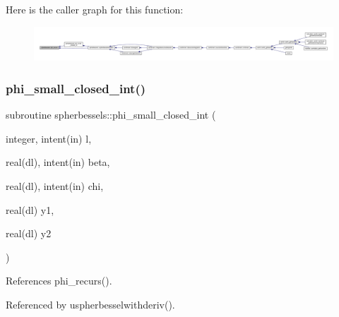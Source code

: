 Here is the caller graph for this function\+:
\nopagebreak
\begin{figure}[H]
\begin{center}
\leavevmode
\includegraphics[width=350pt]{namespacespherbessels_ac2bed68bb6862f56c27d5a5cfc5fd94d_icgraph}
\end{center}
\end{figure}
\mbox{\label{namespacespherbessels_a0d5dede9bff52decb1e7fb2d2df35d3a}} 
\subsubsection{\texorpdfstring{phi\+\_\+small\+\_\+closed\+\_\+int()}{phi\_small\_closed\_int()}}
{\footnotesize\ttfamily subroutine spherbessels\+::phi\+\_\+small\+\_\+closed\+\_\+int (\begin{DoxyParamCaption}\item[{integer, intent(in)}]{l,  }\item[{real(dl), intent(in)}]{beta,  }\item[{real(dl), intent(in)}]{chi,  }\item[{real(dl)}]{y1,  }\item[{real(dl)}]{y2 }\end{DoxyParamCaption})\hspace{0.3cm}{\ttfamily [private]}}



References phi\+\_\+recurs().



Referenced by uspherbesselwithderiv().

